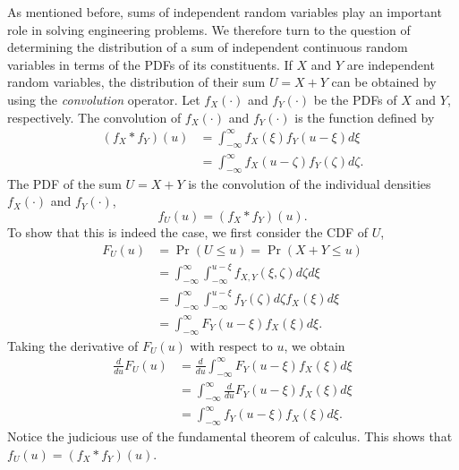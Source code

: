As mentioned before, sums of independent random variables play an important role in solving engineering problems.
We therefore turn to the question of determining the distribution of a sum of independent continuous random variables in terms of the PDFs of its constituents.
If $X$ and $Y$ are independent random variables, the distribution of their sum $U = X + Y$ can be obtained by using the \emph{convolution} operator. 
Let $f_X (\cdot)$ and $f_Y (\cdot)$ be the PDFs of $X$ and $Y$, respectively.
The convolution of $f_X(\cdot)$ and $f_Y(\cdot)$ is the function defined by
\begin{equation*}
\begin{split}
(f_X \ast f_Y) (u)
&= \int_{-\infty}^{\infty} f_X(\xi) f_Y(u - \xi) d\xi \\
&= \int_{-\infty}^{\infty} f_X(u - \zeta) f_Y(\zeta) d\zeta .
\end{split}
\end{equation*}
The PDF of the sum $U = X + Y$ is the convolution of the individual densities $f_X(\cdot)$ and $f_Y(\cdot)$,
\begin{equation*}
f_U (u) = (f_X \ast f_Y) (u) .
\end{equation*}
To show that this is indeed the case, we first consider the CDF of $U$,
\begin{equation*}
\begin{split}
F_U (u) &= \Pr (U \leq u) = \Pr (X + Y \leq u) \\
&= \int_{-\infty}^{\infty} \int_{-\infty}^{u - \xi} f_{X,Y} (\xi, \zeta) d\zeta d\xi \\
&= \int_{-\infty}^{\infty} \int_{-\infty}^{u - \xi} f_Y (\zeta) d\zeta f_X (\xi) d\xi \\
&= \int_{-\infty}^{\infty} F_Y (u - \xi) f_X(\xi) d\xi .
\end{split}
\end{equation*}
Taking the derivative of $F_U (u)$ with respect to $u$, we obtain
\begin{equation*}
\begin{split}
\frac{d}{du} F_U (u)
&= \frac{d}{du} \int_{-\infty}^{\infty} F_Y (u - \xi) f_X(\xi) d\xi \\
&= \int_{-\infty}^{\infty} \frac{d}{du} F_Y (u - \xi) f_X(\xi) d\xi \\
&= \int_{-\infty}^{\infty} f_Y (u - \xi) f_X(\xi) d\xi .
\end{split}
\end{equation*}
Notice the judicious use of the fundamental theorem of calculus.
This shows that $f_U(u) = (f_X \ast f_Y) (u)$.

